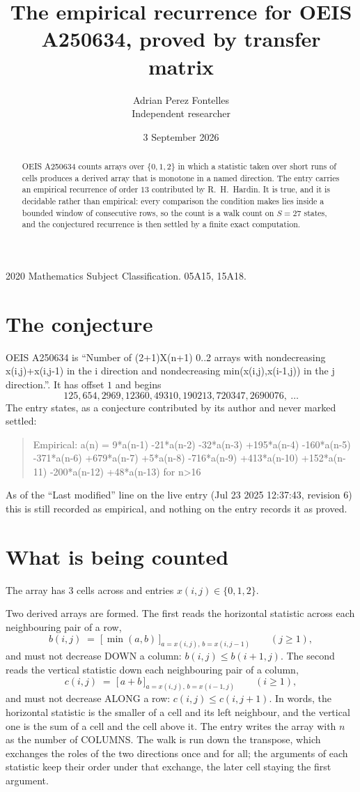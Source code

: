 \documentclass[11pt,a4paper]{article}
\title{The empirical recurrence for OEIS A250634, proved by transfer matrix}
\author{Adrian Perez Fontelles\\ \small Independent researcher}
\date{3 September 2026}
\theoremstyle{plain}
\theoremstyle{definition}
\begin{document}
\maketitle

\begin{abstract}
OEIS A250634 counts arrays over $\{0,1,2\}$ in which a statistic taken over short runs
of cells produces a derived array that is monotone in a named direction. The entry carries an
empirical recurrence of order $13$ contributed by R.~H.~Hardin. It is true, and it is
decidable rather than empirical: every comparison the condition makes lies inside a bounded
window of consecutive rows, so the count is a walk count on $S=27$ states, and the
conjectured recurrence is then settled by a finite exact computation.
\end{abstract}

\noindent\small 2020 Mathematics Subject Classification. 05A15, 15A18.\normalsize

\section{The conjecture}

OEIS A250634 is ``Number of (2+1)X(n+1) 0..2 arrays with nondecreasing x(i,j)+x(i,j-1) in the i direction and nondecreasing min(x(i,j),x(i-1,j)) in the j direction.''. It has offset $1$ and begins
\[
125, 654, 2969, 12360, 49310, 190213, 720347, 2690076,\ \dots
\]
The entry states, as a conjecture contributed by its author and never marked settled:
\begin{quote}
Empirical: a(n) = 9*a(n-1) -21*a(n-2) -32*a(n-3) +195*a(n-4) -160*a(n-5) -371*a(n-6) +679*a(n-7) +5*a(n-8) -716*a(n-9) +413*a(n-10) +152*a(n-11) -200*a(n-12) +48*a(n-13) for n>16
\end{quote}
As of the ``Last modified'' line on the live entry (Jul 23 2025 12:37:43, revision 6) this is still
recorded as empirical, and nothing on the entry records it as proved.

\section{What is being counted}

The array has $3$ cells across and entries $x(i,j)\in\{0,1,2\}$.

Two derived arrays are formed. The first reads the horizontal statistic across each
neighbouring pair of a row,
\[
b(i,j)\;=\;\bigl[\,\min(a,b)\,\bigr]_{a=x(i,j),\,b=x(i,j-1)}\qquad (j\ge1),
\]
and must not decrease DOWN a column: $b(i,j)\le b(i{+}1,j)$. The second reads the vertical
statistic down each neighbouring pair of a column,
\[
c(i,j)\;=\;\bigl[\,a+b\,\bigr]_{a=x(i,j),\,b=x(i{-}1,j)}\qquad (i\ge1),
\]
and must not decrease ALONG a row: $c(i,j)\le c(i,j{+}1)$. In words, the horizontal statistic
is the smaller of a cell and its left neighbour, and the vertical one is
the sum of a cell and the cell above it. The entry writes the array with $n$ as the number of COLUMNS. The walk is run down the transpose, which exchanges the roles of the two directions once and for all; the arguments of each statistic keep their order under that exchange, the later cell staying the first argument.
\end{document}
